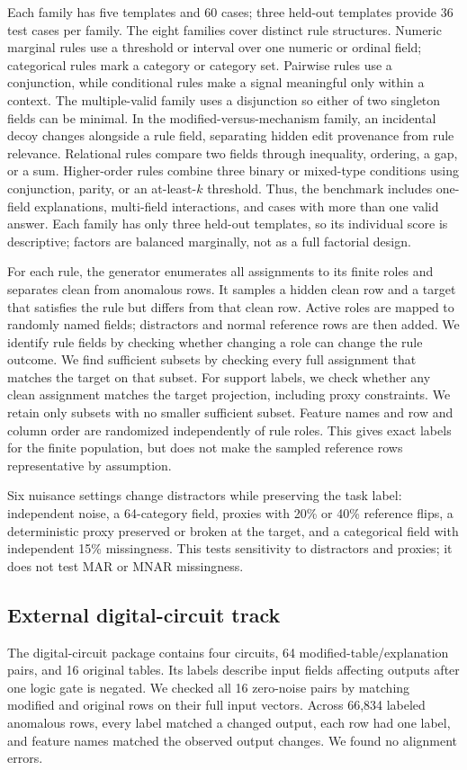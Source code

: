 \documentclass[conference]{IEEEtran}
\begin{document}
Each family has five templates and 60 cases; three held-out templates provide 36 test cases per family. The eight families cover distinct rule structures. Numeric marginal rules use a threshold or interval over one numeric or ordinal field; categorical rules mark a category or category set. Pairwise rules use a conjunction, while conditional rules make a signal meaningful only within a context. The multiple-valid family uses a disjunction so either of two singleton fields can be minimal. In the modified-versus-mechanism family, an incidental decoy changes alongside a rule field, separating hidden edit provenance from rule relevance. Relational rules compare two fields through inequality, ordering, a gap, or a sum. Higher-order rules combine three binary or mixed-type conditions using conjunction, parity, or an at-least-$k$ threshold. Thus, the benchmark includes one-field explanations, multi-field interactions, and cases with more than one valid answer. Each family has only three held-out templates, so its individual score is descriptive; factors are balanced marginally, not as a full factorial design.



For each rule, the generator enumerates all assignments to its finite roles and separates clean from anomalous rows. It samples a hidden clean row and a target that satisfies the rule but differs from that clean row. Active roles are mapped to randomly named fields; distractors and normal reference rows are then added. We identify rule fields by checking whether changing a role can change the rule outcome. We find sufficient subsets by checking every full assignment that matches the target on that subset. For support labels, we check whether any clean assignment matches the target projection, including proxy constraints. We retain only subsets with no smaller sufficient subset. Feature names and row and column order are randomized independently of rule roles. This gives exact labels for the finite population, but does not make the sampled reference rows representative by assumption.

Six nuisance settings change distractors while preserving the task label: independent noise, a 64-category field, proxies with 20\% or 40\% reference flips, a deterministic proxy preserved or broken at the target, and a categorical field with independent 15\% missingness. This tests sensitivity to distractors and proxies; it does not test MAR or MNAR missingness.



\subsection{External digital-circuit track}
The digital-circuit package contains four circuits, 64 modified-table/explanation pairs, and 16 original tables. Its labels describe input fields affecting outputs after one logic gate is negated. We checked all 16 zero-noise pairs by matching modified and original rows on their full input vectors. Across 66,834 labeled anomalous rows, every label matched a changed output, each row had one label, and feature names matched the observed output changes. We found no alignment errors.
\end{document}
